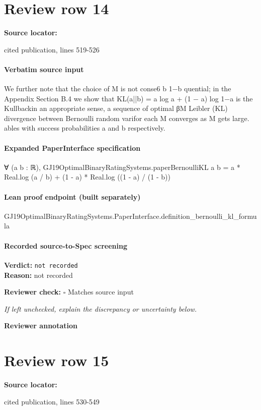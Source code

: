 \documentclass[10pt]{article}
\newcommand{\reviewerbox}{%
  \par\noindent\fbox{\parbox{0.96\linewidth}{\rule{0pt}{0.38in}}}\par
}
\newcommand{\reviewmatch}[1]{%
  \par\noindent\textbf{Reviewer check:} $\square$\; #1\par
  \noindent\emph{If left unchecked, explain the discrepancy or uncertainty below.}\par
}
\begin{document}
\section*{Review row 14}
\textbf{Source locator:} {\footnotesize\raggedright cited publication, lines 519-\allowbreak{}526\par}
\paragraph{Verbatim source input}
\begin{ReviewVerbatim}
We further note that the choice of M is not conse6
b
1−b
quential; in the Appendix Section B.4 we show that
KL(a||b) = a log a + (1 − a) log 1−a is the Kullbackin an appropriate sense, a sequence of optimal βM
Leibler (KL) divergence between Bernoulli random varifor
each M converges as M gets large.
ables with success probabilities a and b respectively.
\end{ReviewVerbatim}


\paragraph{Expanded PaperInterface specification}
\begin{ReviewVerbatim}
∀ (a b : ℝ),
  GJ19OptimalBinaryRatingSystems.paperBernoulliKL a b = a * Real.log (a / b) + (1 - a) * Real.log ((1 - a) / (1 - b))
\end{ReviewVerbatim}

\paragraph{Lean proof endpoint (built separately)}\begin{ReviewVerbatim}
GJ19OptimalBinaryRatingSystems.PaperInterface.definition_bernoulli_kl_formula
\end{ReviewVerbatim}

\paragraph{Recorded source-to-Spec screening}
\textbf{Verdict:} \texttt{not recorded}
\\
\textbf{Reason:} not recorded
\reviewmatch{Matches source input}
\noindent\textbf{Reviewer annotation}\par
\reviewerbox
\clearpage
\hypertarget{source-claim-d2fd3442bfa83879}{}
\section*{Review row 15}
\textbf{Source locator:} {\footnotesize\raggedright cited publication, lines 530-\allowbreak{}549\par}
\end{document}
